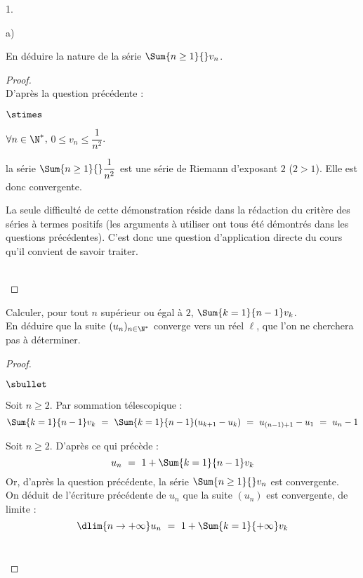 \documentclass[11pt]{article}%
\begin{document}
\begin{noliste}{1.}
\begin{noliste}{a)}
    \newpage
    
    
  \item En déduire la nature de la série $\Sum{n \geq 1}{} v_n$.
    \begin{proof}~\\
      D'après la question précédente :
      \begin{noliste}{$\stimes$}
      \item $\forall n \in \N^*$, $0 \leq v_n \leq \dfrac{1}{n^2}$.
        
      \item la série $\Sum{n \geq 1}{} \dfrac{1}{n^2}$ est une série
        de Riemann d'exposant $2$ ($2>1$). Elle est donc convergente.
      \end{noliste}
      \begin{remark}
        La seule difficulté de cette démonstration réside dans la
        rédaction du critère des séries à termes positifs (les
        arguments à utiliser ont tous été démontrés dans les questions
        précédentes). C'est donc une question d'application directe du
        cours qu'il convient de savoir traiter.
      \end{remark}~\\[-1.4cm]
    \end{proof}
    
  \item Calculer, pour tout $n$ supérieur ou égal à $2$,
    $\Sum{k=1}{n-1} v_k$.\\
    En déduire que la suite $(u_n)_{n\in \N^*}$ converge vers un réel
    $\ell$, que l'on ne cherchera pas à déterminer.
    \begin{proof}~
      \begin{noliste}{$\sbullet$}
      \item Soit $n \geq 2$. Par sommation télescopique :
        \[
          \Sum{k=1}{n-1} v_k \ = \ \Sum{k=1}{n-1} (u_{k+1} - u_k) \ =
          \ u_{(n-1)+1} - u_1 \ = \ u_n - 1
        \]
        
      \item Soit $n \geq 2$. D'après ce qui précède :
        \[
          u_n \ = \ 1 + \Sum{k=1}{n-1} v_k
        \]
        Or, d'après la question précédente, la série $\Sum{n \geq 1}{}
        v_n$ est convergente.\\ %
        On déduit de l'écriture précédente de $u_n$ que la suite
        $(u_n)$ est convergente, de limite :
        \[
          \dlim{n \to + \infty} u_n \ = \ 1+ \Sum{k=1}{+\infty} v_k
        \]
        ~\\[-1.4cm]
      \end{noliste}
    \end{proof}
  \end{noliste}



\end{noliste}
\end{document}
